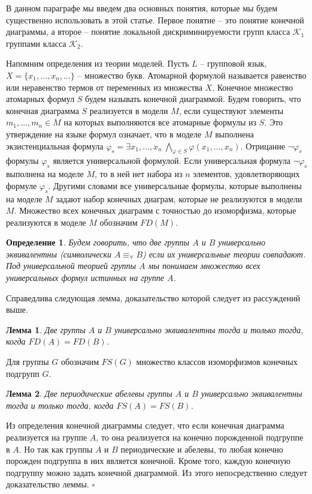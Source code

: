 \documentclass[a4paper,11pt,twoside]{article}
\newtheorem{lemma}{Лемма}[section]
\newtheorem{definition}{Определение}[section]
\def\proof{{\noindent{\bf Доказательство.}} }
\def\K{{\mathcal{K}}}
\begin{document}
В данном параграфе мы введем два основных понятия, которые мы будем существенно использовать в этой статье. Первое понятие -- это понятие конечной диаграммы, а второе -- понятие локальной дискриминируемости групп класса $\K_1$ группами класса $\K_2$.

Напомним определения из теории моделей. Пусть $L$ -- групповой язык, $X = \{x_1, \ldots, x_n, \ldots\}$ -- множество букв. Атомарной формулой называется равенство или неравенство термов от переменных из множества $X$. Конечное множество атомарных формул $S$ будем называть конечной диаграммой. Будем говорить, что конечная диаграмма $S$ реализуется в модели $M$, если существуют элементы $m_1, \ldots, m_n \in M$ на которых выполняются все атомарные формулы из $S$. Это утверждение на языке формул означает, что в моделе $M$ выполнена экзистенциальная формула $\varphi_s = \exists x_1, \ldots, x_n \ \bigwedge\limits_{\varphi \in S} \varphi(x_1, \ldots, x_n)$. Отрицание $\neg\varphi_s$ формулы $\varphi_s$ является универсальной формулой. Если универсальная формула $\neg\varphi_s$ выполнена на моделе $M$, то в ней нет набора из $n$ элементов, удовлетворяющих формуле $\varphi_s$. Другими словами все универсальные формулы, которые выполнены на моделе $M$ задают набор конечных диаграм, которые не реализуются в модели $M$. Множество всех конечных диаграмм с точностью до изоморфизма, которые реализуются в моделе $M$ обозначим $FD(M)$. 
\begin{definition}
Будем говорить, что две группы $A$ и $B$ универсально эквивалентны (символически $A \equiv_\forall B$) если их универсальные теории совпадают. Под универсальной теорией группы $A$ мы понимаем множество всех универсальных формул истинных на группе $A$.
\end{definition}
Справедлива следующая лемма, доказательство которой следует из рассуждений выше.

\begin{lemma}
Две группы $A$ и $B$ универсально эквивалентны тогда и только тогда, когда $FD(A) = FD(B)$.
\end{lemma}

Для группы $G$ обозначим $FS(G)$ множество классов изоморфизмов конечных подгрупп $G$.

\begin{lemma}\label{lemma:UnivEquivFS}
Две периодические абелевы группы $A$ и $B$ универсально эквивалентны тогда и только тогда, когда $FS(A) = FS(B)$.
\end{lemma}
\proof Из определения конечной диаграммы следует, что если конечная диаграмма реализуется на группе $A$, то она реализуется на конечно порожденной подгруппе в $A$. Но так как группы $A$ и $B$ периодические и абелевы, то любая конечно порожден подгруппа в них является конечной. Кроме того, каждую конечную подгруппу можно задать конечной диаграммой. Из этого непосредственно следует доказательство леммы. $\square$
\end{document}
